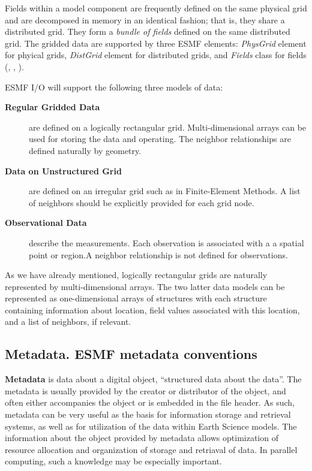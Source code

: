 Fields within a model component are frequently defined on the same
physical grid and are decomposed in memory in an identical fashion;
that is, they share a distributed grid. They form a {\em bundle of
fields} defined on the same distributed grid. The gridded data are
supported by three ESMF elements: {\em PhysGrid} element 
for phyical grids, {\em DistGrid} element for distributed grids, and 
{\em Fields} class for fields (\cite{ESMF-PhysGrid-Req},
\cite{ESMF-DistGrid-Req}, \cite{ESMF-Field-Req}). 

ESMF I/O will support the following three models of data: 
\begin{description}
\item[\bf Regular Gridded Data] are defined on a logically rectangular grid. 
Multi-dimensional arrays can be used for storing the data and operating. The 
neighbor relationships are defined naturally by geometry.

\item[\bf Data on Unstructured Grid] are defined on an irregular grid such as 
in Finite-Element Methods. A list of neighbors should be explicitly provided 
for each grid node. 

\item[\bf Observational Data] describe the measurements. Each observation is 
associated with a a spatial point or region.A neighbor relationship is not 
defined for observations. 
\end{description}

As we have already mentioned, logically rectangular grids are naturally 
represented by multi-dimensional arrays. The two latter data models can be 
represented as one-dimensional arrays of structures with each structure 
containing information about location, field values associated with this 
location, and a list of neighbors, if relevant. 

\subsection{Metadata. ESMF metadata conventions}

{\bf Metadata} is data about a digital object, ``structured data about the 
data''. The metadata is usually provided by the creator or distributor of 
the object, and often either accompanies the object or is embedded in the 
file header. As such, metadata can be very useful as the basis for 
information storage and retrieval systems, as well as for utilization of the 
data within Earth Science models.
The information about the object provided by metadata allows optimization of  
resource allocation and organization of storage and retriaval of data. In 
parallel computing, such a knowledge may be especially important. 


